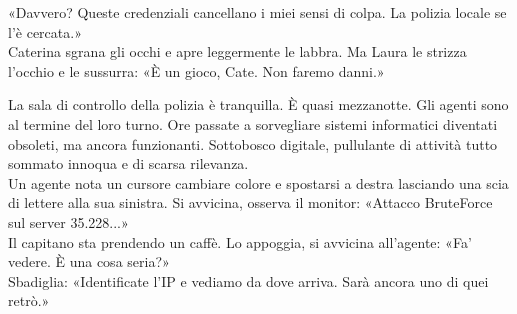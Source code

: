 «Davvero? Queste credenziali cancellano i miei sensi di colpa. La polizia locale se l’\`e cercata.»\\
Caterina sgrana gli occhi e apre leggermente le labbra. Ma Laura le strizza l’occhio e le sussurra:
«\`E un gioco, Cate. Non faremo danni.»

\separatore

\par\medskip
La sala di controllo della polizia  \`e tranquilla. \`E quasi mezzanotte. Gli agenti sono al termine del loro turno. Ore passate a sorvegliare sistemi informatici diventati obsoleti, ma ancora funzionanti. Sottobosco digitale, pullulante di attività tutto sommato innoqua e di scarsa rilevanza.\\
Un agente nota un cursore cambiare colore e spostarsi a destra lasciando una scia di lettere alla sua sinistra. Si avvicina, osserva il monitor:
«Attacco BruteForce sul server 35.228...»\\
Il capitano sta prendendo un caff\`e. Lo appoggia, si avvicina all’agente: «Fa’ vedere. \`E una cosa seria?»\\
Sbadiglia: «Identificate l’IP e vediamo da dove arriva. Sarà ancora uno di quei retrò.»

